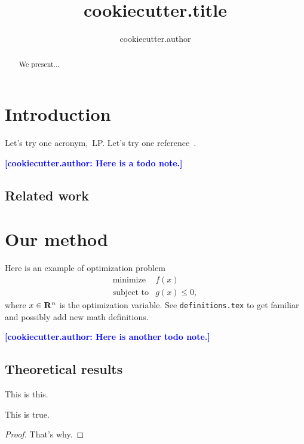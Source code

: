 \documentclass[12pt]{article}
\title{ {{cookiecutter.title}} }
\author{ {{cookiecutter.author}} }
\newcommand{\mynote}[1]{}
\renewcommand{\mynote}[1]{\textcolor{blue}{\textbf{[{{cookiecutter.author}}: #1]}}}
\begin{document}
\maketitle

\begin{abstract}
We present...
\end{abstract}



\section{Introduction}

Let's try one acronym,~\gls{LP}. Let's try one reference~\cite{conforti2014}.

\mynote{Here is a todo note.}


\subsection{Related work}

\section{Our method}

Here is an example of optimization problem
\begin{equation*}
	\begin{array}{ll}
		\text{minimize} & f(x)\\
		\text{subject to} & g(x)\le 0,
	\end{array}
\end{equation*}
where $x \in {\mathbf R}^n$ is the optimization variable.
See {\tt definitions.tex} to get familiar and possibly add new math definitions.


\mynote{Here is another todo note.}

\subsection{Theoretical results}%
\label{sub:theoretical_results}


\begin{definition}
	This is this.
\end{definition}


\begin{theorem}
	This is true.
\end{theorem}
\begin{proof}
	That's why.
\end{proof}
\end{document}
